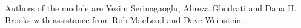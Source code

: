 



\ModuleRefCredits

Authors of the  module are Yesim Serinagaoglu, Alireza
Ghodrati and Dana H. Brooks with assistance from Rob MacLeod and Dave
Weinstein.
